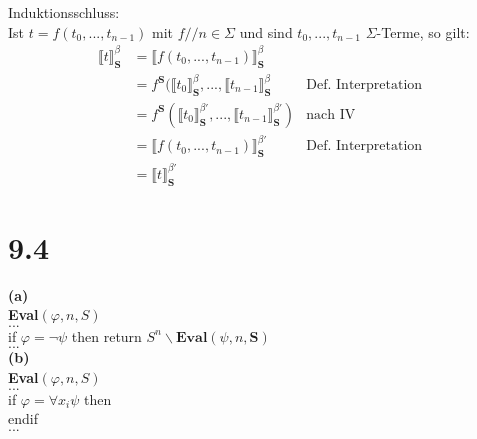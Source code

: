 \documentclass[12pt,a4paper]{scrartcl}
\begin{document}
  Induktionsschluss:\\
  Ist $t = f(t_0, ...,t_{n-1})$ mit $f // n \in \Sigma$ und sind $t_0, ..., t_{n-1}$ $\Sigma$-Terme, so gilt:\\
  \begin{align*}
  \llbracket t \rrbracket^{\beta}_{\textbf{S}} &= \llbracket f(t_0, ...,t_{n-1}) \rrbracket^{\beta}_{\textbf{S}}\\
                                               &= f^{\textbf{S}}(\llbracket t_0 \rrbracket^{\beta}_{\textbf{S}}, ...,\llbracket t_{n-1} \rrbracket^{\beta}_{\textbf{S}} &\text{Def. Interpretation}\\
                                               &= f^{\textbf{S}}(\llbracket t_0 \rrbracket^{\beta'}_{\textbf{S}}, ...,\llbracket t_{n-1} \rrbracket^{\beta'}_{\textbf{S}}) &\text{nach IV}\\
                                               &= \llbracket f(t_0, ...,t_{n-1}) \rrbracket^{\beta'}_{\textbf{S}} &\text{Def. Interpretation}\\
                                               &= \llbracket t\rrbracket^{\beta'}_{\textbf{S}}
  \end{align*}  
  \section*{9.4}
  \noindent
  \textbf{(a)}\\
  
  \textbf{Eval}$(\varphi, n, S)$\\
  $...$\\
  if $\varphi = \neg \psi$ then return $S^n \backslash \textbf{Eval}(\psi, n, \textbf{S})$\\
  $...$\\
  \textbf{(b)}\\
  
  \textbf{Eval}$(\varphi, n, S)$\\
  $...$\\
  if $\varphi = \forall x_i \psi$ then\\
    
  endif\\
  $...$\\
  
\end{document}
